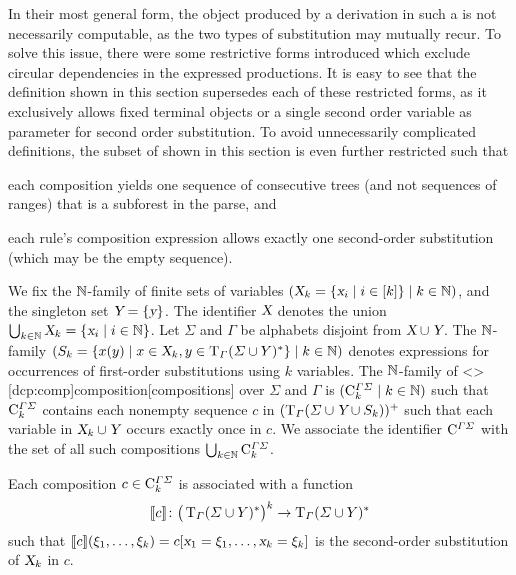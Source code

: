 \documentclass[../document.tex]{subfiles}
\begin{document}
    In their most general form, the object produced by a derivation in such a  is not necessarily computable, as the two types of substitution may mutually recur.
    To solve this issue, there were some restrictive forms introduced which exclude circular dependencies in the expressed productions. \citep[Sec.~3.4 about non-circular attribute grammars]{Cou82}
    It is easy to see that the definition shown in this section supersedes each of these restricted forms, as it exclusively allows fixed terminal objects or a single second order variable as parameter for second order substitution.
    To avoid unnecessarily complicated definitions, the subset of  shown in this section is even further restricted such that
    \begin{inparaenum}
        \item each composition yields one sequence of consecutive trees (and not sequences of ranges) that is a subforest in the parse, and
        \item each rule's composition expression allows exactly one second-order substitution (which may be the empty sequence).
    \end{inparaenum}

    \begin{definition}[Composition]
        We fix the \(\mathbb{N}\)-family of finite sets of variables \((\textsl{X}_k = \{\textsl{x}_i \mid i \in [k]\} \mid k \in \mathbb{N})\), and the singleton set \(\textsl{Y} = \{\textsl{y}\}\).
        The identifier \(\textsl{X}\) denotes the union \(\bigcup_{k \in \mathbb{N}} \textsl{X}_k = \{\textsl{x}_i \mid i \in \mathbb{N}\}\).
        Let \(\varSigma\) and \(\varGamma\) be alphabets disjoint from \(\textsl{X} \cup \textsl{Y}\).
        The \(\mathbb{N}\)-family \((S_k = \{x(y) \mid x \in \textsl{X}_k, y \in \operatorname{T}_\varGamma(\varSigma \cup Y)^*\} \mid k \in \mathbb{N})\) denotes expressions for occurrences of first-order substitutions using \(k\) variables.
        The \(\mathbb{N}\)-family of  <\dcp>[dcp:comp]{composition}[compositions] over \(\varSigma\) and \(\varGamma\) is \((\mathrm{C}^{\varGamma\varSigma}_k \mid k \in \mathbb{N})\) such that \(\mathrm{C}^{\varGamma\varSigma}_k\) contains each nonempty sequence \(c\) in \((\operatorname{T}_\varGamma(\varSigma \cup \textsl{Y} \cup S_k))^+\) such that each variable in \(\textsl{X}_k \cup \textsl{Y}\) occurs exactly once in \(c\).
        We associate the identifier \(\mathrm{C}^{\varGamma\varSigma}\) with the set of all such  compositions \(\bigcup_{k \in \mathbb{N}} \mathrm{C}^{\varGamma\varSigma}_{k}\).

        Each composition \(c \in \mathrm{C}^{\varGamma\varSigma}_k\) is associated with a function \[
            \llbracket c\rrbracket\colon \big(\operatorname{T}_\varGamma(\varSigma \cup Y)^*\big)^k \to \operatorname{T}_\varGamma(\varSigma \cup Y)^*
        \] such that \(\llbracket c\rrbracket(\xi_1, \ldots, \xi_k) = c[\textsl{x}_1=\xi_1, \ldots, \textsl{x}_k=\xi_k]\) is the second-order substitution of \(\textsl{X}_k\) in \(c\).
    \end{definition}
\end{document}
